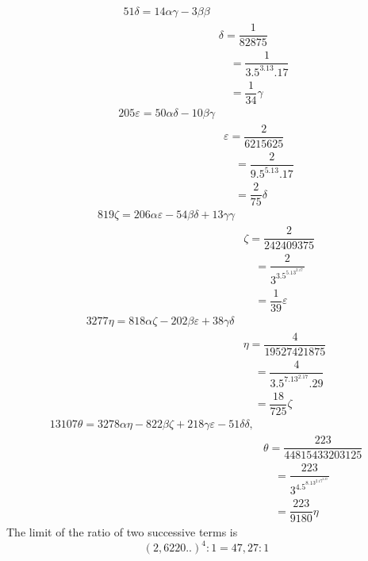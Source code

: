\[
\begin{aligned}51\delta=14\alpha\gamma-3\beta\beta\\[5pt]&\delta=\dfrac1{82875}\\[5pt]&\quad=\dfrac1{3.5^3.13.17}\\[5pt]&\quad=\dfrac1{34}\gamma\end{aligned}
\]
\[
\begin{aligned}205\varepsilon=50\alpha\delta-10\beta\gamma\\[5pt]&\varepsilon=\dfrac2{6215625}\\[5pt]&\quad=\dfrac2{9.5^5.13.17}\\[5pt]&\quad=\dfrac2{75}\delta\end{aligned}
\]
\[
\begin{aligned}819\zeta=206\alpha\varepsilon-54\beta\delta+13\gamma\gamma\\[5pt]&\zeta=\dfrac2{242409375}\\[5pt]&\quad=\dfrac2{3^3.5^5.13^2.17}\\[5pt]&\quad=\dfrac1{39}\varepsilon\end{aligned}
\]
\[
\begin{aligned}3277\eta=818\alpha\zeta-202\beta\varepsilon+38\gamma\delta\\[5pt]&\eta=\dfrac4{19527421875}\\[5pt]&\quad=\dfrac4{3.5^7.13^2.17.29}\\[5pt]&\quad=\dfrac{18}{725}\zeta\end{aligned}
\]
\[
\begin{aligned}13107\theta=3278\alpha\eta-822\beta\zeta+218\gamma\varepsilon-51\delta\delta,\\[5pt]&\theta=\dfrac{223}{44815433203125}\\[5pt]&\quad=\dfrac{223}{3^4.5^8.13^2.17^2.29}\\[5pt]&\quad=\dfrac{223}{9180}\eta\end{aligned}
\]
The limit of the ratio of two successive terms is
\[
(2{,}6220\mathord{.}\mathord{.})^4:1=47{,}27:1
\]


